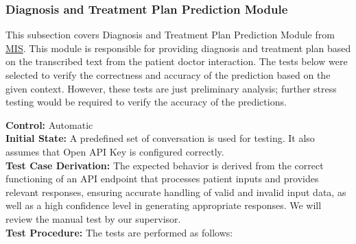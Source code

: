\documentclass[12pt, titlepage]{article}
\begin{document}
\subsubsection{Diagnosis and Treatment Plan Prediction Module}

This subsection covers Diagnosis and Treatment Plan Prediction Module from \href{https://github.com/PKALXI/RapidCare/blob/main/docs/Design/SoftDetailedDes/MIS.pdf}{MIS}. This module is responsible for providing diagnosis and treatment plan based on the transcribed text from the patient doctor interaction. The tests below were selected to verify the correctness and accuracy of the prediction based on the given context. However, these tests are just preliminary analysis; further stress testing would be required to verify the accuracy of the predictions.

\textbf{Control:} Automatic\\ 
\textbf{Initial State:} A predefined set of conversation is used for testing. It also assumes that Open API Key is configured correctly.\\ 
\textbf{Test Case Derivation:} The expected behavior is derived from the correct functioning of an API endpoint that processes patient inputs and provides relevant responses, ensuring accurate handling of valid and invalid input data, as well as a high confidence level in generating appropriate responses. We will review the manual test by our supervisor.\\ 
\textbf{Test Procedure:} The tests are performed as follows:\\
\end{document}
